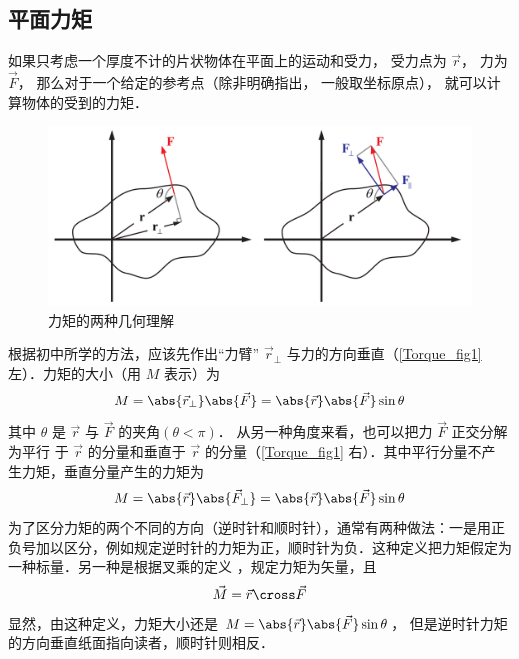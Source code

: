 
\subsection{平面力矩}

如果只考虑一个厚度不计的片状物体在平面上的运动和受力， 受力点为 $\vec r$， 力为 $\vec F$， 那么对于一个给定的参考点（除非明确指出， 一般取坐标原点）， 就可以计算物体的受到的力矩．


\begin{figure}[ht]
\centering
\includegraphics[width=13cm]{./figures/Torque.pdf}
\caption{力矩的两种几何理解}\label{Torque_fig1}
\end{figure}

根据初中所学的方法，应该先作出“力臂” ${\vec r_ \bot }$ 与力的方向垂直（\autoref{Torque_fig1} 左）．力矩的大小（用 $M$ 表示）为
\begin{equation}
M = \abs{{\vec r}_ \bot } \abs{\vec F} = \abs{\vec r} \abs{\vec F} \sin \theta 
\end{equation}
其中 $\theta $ 是 $\vec r$ 与 $\vec F$ 的夹角$(\theta < \pi)$． 
从另一种角度来看，也可以把力 $\vec F$ 正交分解为平行
于 $\vec r$ 的分量和垂直于 $\vec r$ 的分量（\autoref{Torque_fig1} 右）．其中平行分量不产
生力矩，垂直分量产生的力矩为
\begin{equation}
M = \abs{\vec r} \abs{{{\vec F}_ \bot }} = \abs{\vec r} \abs{\vec F} \sin \theta 
\end{equation}
为了区分力矩的两个不同的方向（逆时针和顺时针），通常有两种做法：一是用正负号加以区分，例如规定逆时针的力矩为正，顺时针为负．这种定义把力矩假定为一种标量．另一种是根据叉乘的定义
，规定力矩为矢量，且
\begin{equation}\label{Torque_eq3}
\vec M = \vec r \cross \vec F
\end{equation}
显然，由这种定义，力矩大小还是 $M = \abs{\vec r} \abs{\vec F}\sin \theta $， 但是逆时针力矩的方向垂直纸面指向读者，顺时针则相反．


